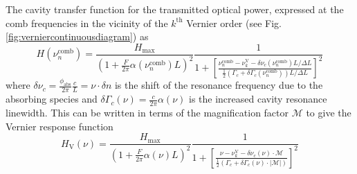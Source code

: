 \documentclass[12pt]{report}
\begin{document}
	The cavity transfer function for the transmitted optical power, expressed at the comb frequencies in the vicinity of the $k^\mathrm{th}$ Vernier order (see Fig. \ref{fig:verniercontinuousdiagram}) as
	\begin{equation}
		H(\nu_n^\mathrm{comb}) = \frac{H_\mathrm{max}}{\left(1 + \frac{F}{2\pi}\alpha\left(\nu_n^\mathrm{comb} \right)L\right)^2} \frac{1}{1 + \left[\frac{\nu_n^\mathrm{comb} - \nu_k^\mathrm{V} - \delta \nu_c(\nu_n^\mathrm{comb}) L/\Delta L}{\frac{1}{2}\left(\Gamma_c + \delta \Gamma_c(\nu_n^\mathrm{comb})\right) L/\Delta L}\right]^2}
	\end{equation}
	where $\delta\nu_c = \frac{\phi_\mathrm{abs}}{2\pi}\frac{c}{L} = \nu \cdot\delta n$ is the shift of the resonance frequency due to the absorbing species and $\delta\Gamma_c(\nu) = \frac{c}{2\pi}\alpha(\nu)$ is the increased cavity resonance linewidth. This can be written in terms of the magnification factor $\mathcal{M}$ to give the Vernier response function \cite{vernier_continuous_filtering}
	\begin{equation}
		H_\mathrm{V}(\nu) =
		\frac{H_\mathrm{max}}{\left(1 + \frac{F}{2\pi}\alpha\left(\nu \right)L\right)^2}
		\frac{1}{1 + \left[\frac{\nu - \nu_k^\mathrm{V} - \delta \nu_c(\nu)\cdot\mathcal{M}}{\frac{1}{2}\left(\Gamma_c + \delta \Gamma_c(\nu)\cdot\left|\mathcal{M}\right|\right)}\right]^2}
	\end{equation}
	
	
\end{document}
